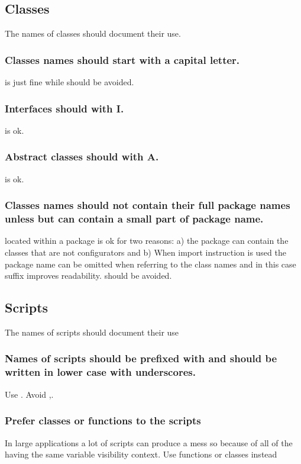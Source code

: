 \documentclass[titlepage,a4paper,12pt]{article}
\begin{document}
\subsection{Classes} The names of classes should document their use.
\subsubsection{Classes names should start with a capital letter.}
 is just fine while
 should be avoided.
\subsubsection{Interfaces should with I.}
 is ok.
\subsubsection{Abstract classes should with A.}
 is ok.
\subsubsection{Classes names should not contain their full package names unless but can contain a small part of package name.}
 located within a package  is ok for two reasons: a) the package can contain the classes that are not configurators and b) When import instruction is used the package name can be omitted when referring to the class names and in this case  suffix improves readability.  should be avoided.

\subsection{Scripts}
 The names of scripts should document their
use
\subsubsection{Names of scripts should be prefixed with  and should be written in lower
case with underscores.} Use . Avoid
,.
\subsubsection{Prefer classes or functions to the scripts}
 In large applications a lot of scripts can produce a mess so because of all of the having the same variable visibility context. Use functions or classes instead
\end{document}
